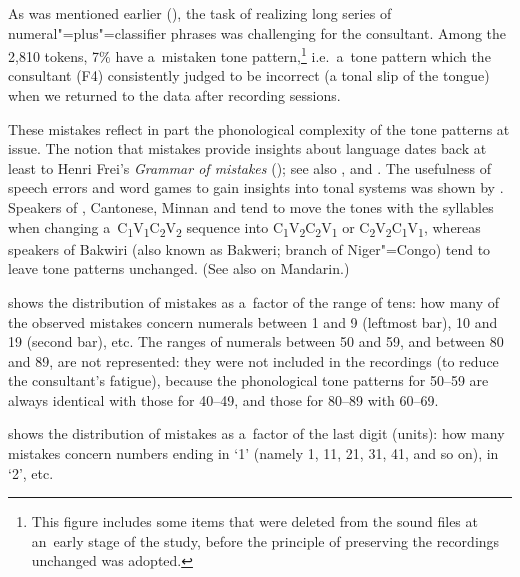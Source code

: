 
As was mentioned earlier (), the task of realizing long series of numeral"=plus"=classifier phrases
was challenging for the consultant. Among the 2,810 tokens, 7\% have a~mistaken tone
pattern,\footnote{This figure includes some items that were deleted from the sound files at an~early
  stage of the study, before the principle of preserving the recordings unchanged was adopted.} i.e.\ a~tone pattern which the consultant (F4) consistently judged to be incorrect (a tonal slip of the
tongue) when we returned to the data after recording sessions.

These mistakes reflect in part the phonological complexity of the tone patterns at issue. The notion
that mistakes provide insights about language dates back at least to Henri Frei’s
\textit{Grammar of mistakes} (\citeyear{frei1929}); see also \citet{fromkin1973},
\citet{rossietal1998} and \citet{nooteboom2011}. The usefulness of speech errors and word games to gain
insights into tonal systems was shown by \citet[180–181]{hombert1986b}. Speakers of ,
Cantonese, Minnan and  tend to move the tones with the syllables when changing
a~C\textsubscript{1}V\textsubscript{1}C\textsubscript{2}V\textsubscript{2} sequence into
C\textsubscript{1}V\textsubscript{2}C\textsubscript{2}V\textsubscript{1} or
C\textsubscript{2}V\textsubscript{2}C\textsubscript{1}V\textsubscript{1}, whereas speakers of
Bakwiri (also known as Bakweri;  branch of Niger"=Congo) tend to leave tone patterns unchanged. (See also
\citet{wanetal1998} on {Mandarin}.)

 shows the distribution of mistakes as a~factor of the range of tens: how many of the
observed mistakes concern numerals between 1 and 9 (leftmost bar), 10 and 19 (second bar),
etc. The ranges of numerals between 50 and 59, and between 80 and 89, are not represented: they were not included in the recordings (to reduce the consultant's fatigue), because the phonological tone patterns for 50--59 are always identical with those for 40--49, and those for 80--89 with 60--69.

 shows the distribution of mistakes as a~factor of the last digit (units): how many
mistakes concern numbers ending in ‘1’ (namely 1, 11, 21, 31, 41, and so on), in ‘2’, etc.

